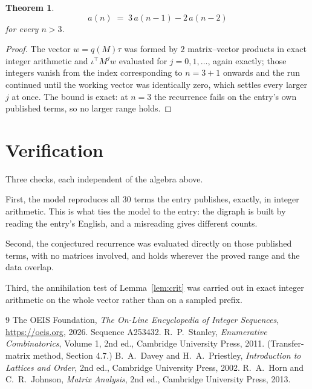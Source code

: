 \documentclass[11pt,a4paper]{article}
\theoremstyle{plain}
\newtheorem{theorem}{Theorem}
\theoremstyle{definition}
\begin{document}
\begin{theorem}
\[
a(n)\;=\;3\,a(n-1) - 2\,a(n-2)
\]
for every $n>3$.
\end{theorem}

\begin{proof}
The vector $w=q(M)\tau$ was formed by $2$ matrix--vector products in exact integer
arithmetic and $\iota^{\!\top}M^{j}w$ evaluated for $j=0,1,\dots$, again exactly; those
integers vanish from the index corresponding to $n=3+1$ onwards and the run continued
until the working vector was identically zero, which settles every larger $j$ at once. The bound is exact: at $n=3$ the recurrence fails on the entry's own published terms, so no larger range holds.
\end{proof}

\section{Verification}

Three checks, each independent of the algebra above.

First, the model reproduces all $30$ terms the entry publishes, exactly, in integer
arithmetic. This is what ties the model to the entry: the digraph is built by reading the
entry's English, and a misreading gives different counts.

Second, the conjectured recurrence was evaluated directly on those published terms, with no
matrices involved, and holds wherever the proved range and the data overlap.

Third, the annihilation test of Lemma~\ref{lem:crit} was carried out in exact integer
arithmetic on the whole vector rather than on a sampled prefix.

\begin{thebibliography}{9}
 The OEIS Foundation, \emph{The On-Line Encyclopedia of Integer
Sequences}, \url{https://oeis.org}, 2026. Sequence A253432.
 R.~P.~Stanley, \emph{Enumerative Combinatorics}, Volume 1, 2nd ed.,
Cambridge University Press, 2011. (Transfer-matrix method, Section 4.7.)
 B.~A.~Davey and H.~A.~Priestley, \emph{Introduction to Lattices and
Order}, 2nd ed., Cambridge University Press, 2002.
 R.~A.~Horn and C.~R.~Johnson, \emph{Matrix Analysis}, 2nd ed., Cambridge
University Press, 2013.
\end{thebibliography}
\end{document}
